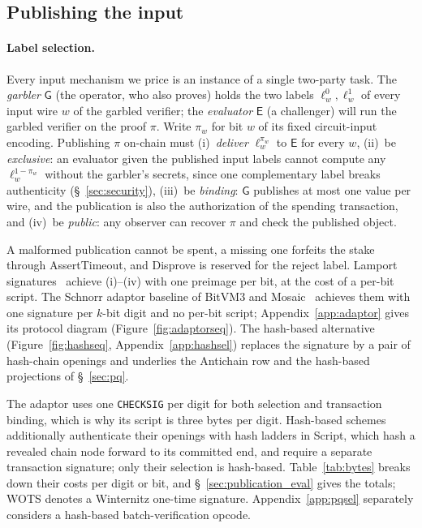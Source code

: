 \documentclass[11pt]{article}
\begin{document}
\subsection{Publishing the input}\label{sec:input}

\paragraph{Label selection.} Every input mechanism we price is an instance of
a single two-party task. The \emph{garbler} $\mathsf{G}$ (the operator, who also
proves) holds the two labels $\ell_w^0,\ell_w^1$ of every input wire $w$ of the
garbled verifier; the \emph{evaluator} $\mathsf{E}$ (a challenger) will run the
garbled verifier on the proof $\pi$. Write $\pi_w$ for bit $w$ of its fixed
circuit-input encoding.
Publishing $\pi$ on-chain must
(i)~\emph{deliver} $\ell_w^{\pi_w}$ to $\mathsf{E}$ for every $w$, (ii)~be
\emph{exclusive}: an evaluator given the published input labels cannot
compute any $\ell_w^{1-\pi_w}$ without the garbler's secrets, since one
complementary label breaks authenticity (\S~\ref{sec:security}), (iii)~be
\emph{binding}: $\mathsf{G}$ publishes at most one value per wire, and the
publication is also the authorization of the spending transaction, and (iv)~be
\emph{public}: any observer can recover $\pi$ and check the published object.

A malformed publication cannot be spent, a missing one forfeits the stake
through AssertTimeout, and Disprove is reserved for the reject label. Lamport
signatures~\cite{lamport79} achieve (i)--(iv) with one preimage per bit, at the cost of a per-bit script.
The Schnorr adaptor baseline of BitVM3 and Mosaic~\cite{bitvm3paper,mosaic26}
achieves them with one signature per $k$-bit digit and no per-bit script;
Appendix~\ref{app:adaptor} gives its protocol diagram
(Figure~\ref{fig:adaptorseq}). The hash-based alternative
(Figure~\ref{fig:hashseq}, Appendix~\ref{app:hashsel}) replaces the signature
by a pair of hash-chain openings and underlies the Antichain row and the
hash-based projections of \S~\ref{sec:pq}.

The adaptor uses one \texttt{CHECKSIG} per digit for both selection and
transaction binding, which is why its script is three bytes per digit.
Hash-based schemes additionally authenticate their openings with hash ladders in Script, which hash a revealed chain node forward to its committed end, and require a separate transaction signature; only their selection
is hash-based. Table~\ref{tab:bytes} breaks down their costs per digit or
bit, and \S~\ref{sec:publication_eval} gives the totals; WOTS denotes a
Winternitz one-time signature. Appendix~\ref{app:pqsel} separately considers
a hash-based batch-verification opcode.
\end{document}
